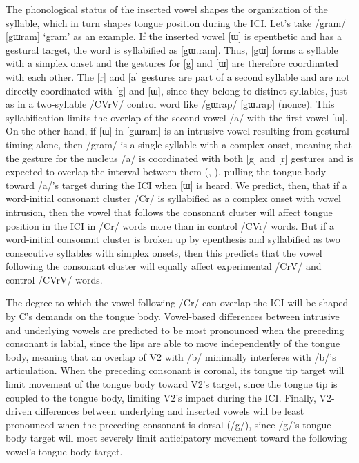 \documentclass[output=paper,colorlinks,citecolor=brown]{langscibook}
\begin{document}
The phonological status of the inserted vowel shapes the organization of the syllable, which in turn shapes tongue position during the ICI. Let's take /gram/ [gɯram] `gram' as an example. If the inserted vowel [ɯ] is epenthetic and has a gestural target, the word is syllabified as [gɯ.ram]. Thus, [gɯ] forms a syllable with a simplex onset and the gestures for [g] and [ɯ] are therefore coordinated with each other. The [r] and [a] gestures are part of a second syllable and are not directly coordinated with [g] and [ɯ], since they belong to distinct syllables, just as in a two-syllable /CVrV/ control word like /gɯrap/ [gɯ.rap] (nonce). This syllabification limits the overlap of the second vowel /a/ with the first vowel [ɯ]. On the other hand, if [ɯ] in [gɯram] is an intrusive vowel resulting from gestural timing alone, then /gram/ is a single syllable with a complex onset, meaning that the gesture for the nucleus /a/ is coordinated with both [g] and [r] gestures and is expected to overlap the interval between them (\citealt{Byrd1996}, \citealt{BrowmanGoldstein1988}), pulling the tongue body toward /a/'s target during the ICI when [ɯ] is heard. We predict, then, that if a word-initial consonant cluster /Cr/ is syllabified as a complex onset with vowel intrusion, then the vowel that follows the consonant cluster will affect tongue position in the ICI in /Cr/ words more than in control /CVr/ words. But if a word-initial consonant cluster is broken up by epenthesis and syllabified as two consecutive syllables with simplex onsets, then this predicts that the vowel following the consonant cluster will equally affect experimental /CrV/ and control /CVrV/ words.

The degree to which the vowel following /Cr/ can overlap the ICI will be shaped by C’s demands on the tongue body. Vowel-based differences between intrusive and underlying vowels are predicted to be most pronounced when the preceding consonant is labial, since the lips are able to move independently of the tongue body, meaning that an overlap of V2 with /b/ minimally interferes with /b/'s articulation. When the preceding consonant is coronal, its tongue tip target will limit movement of the tongue body toward V2’s target, since the tongue tip is coupled to the tongue body, limiting V2’s impact during the ICI. Finally, V2-driven differences between underlying and inserted vowels will be least pronounced when the preceding consonant is dorsal (/g/), since /g/’s tongue body target will most severely limit anticipatory movement toward the following vowel’s tongue body target.
\end{document}
